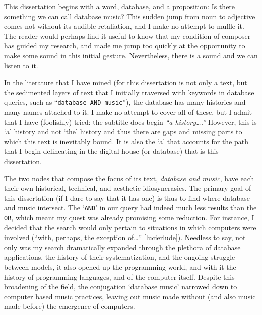 \setcounter{page}{1}

This dissertation begins with a word, database, and a proposition: Is there something we can call database music? This sudden jump from noun to adjective comes not without its audible retaliation, and I make no attempt to muffle it. The reader would perhaps find it useful to know that my condition of composer has guided my research, and made me jump too quickly at the opportunity to make some sound in this initial gesture. Nevertheless, there is a sound and we can listen to it. %


In the literature that I have mined (for this dissertation is not only a text, but the sedimented layers of text that I initially traversed with keywords in database queries, such as ``\texttt{database AND music}''), the database has many histories and many names attached to it. I make no attempt to cover all of these, but I admit that I have (foolishly) tried: the subtitle does begin \textit{``a history\dots.''} However, this is `a’ history and not `the’ history and thus there are gaps and missing parts to which this text is inevitably bound. It is also the `a' that accounts for the path that I begin delineating in the digital house (or database) that is this dissertation.

The two nodes that compose the focus of its text, \textit{database and music}, have each their own historical, technical, and aesthetic idiosyncrasies. The primary goal of this dissertation (if I dare to say that it has one) is thus to find where database and music intersect. The `\texttt{AND}' in our query had indeed much less results than the \texttt{OR}, which meant my quest was already promising some reduction. For instance, I decided that the search would only pertain to situations in which computers were involved (``with, perhaps, the exception of\dots'' \ref{lucierlude}). Needless to say, not only was my search dramatically expanded through the plethora of database applications, the history of their systematization, and the ongoing struggle between models, it also opened up the programming world, and with it the history of programming languages, and of the computer itself. Despite this broadening of the field, the conjugation `database music' narrowed down to computer based music practices, leaving out music made without (and also music made before) the emergence of computers.


